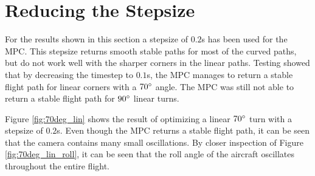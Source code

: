 \section{Reducing the Stepsize}
\label{sec:reducing_stepsize}

For the results shown in this section a stepsize of $0.2$s has been used for the MPC. This stepsize returns smooth stable paths for most of the curved paths, but do not work well with the sharper corners in the linear paths. Testing showed that by decreasing the timestep to $0.1$s, the MPC manages to return a stable flight path for linear corners with a $70\degree$ angle. The MPC was still not able to return a stable flight path for $90\degree$ linear turns.

Figure \ref{fig:70deg_lin} shows the result of optimizing a linear $70\degree$ turn with a stepsize of $0.2$s. Even though the MPC returns a stable flight path, it can be seen that the camera contains many small oscillations. By closer inspection of Figure \ref{fig:70deg_lin_roll}, it can be seen that the roll angle of the aircraft oscillates throughout the entire flight. 